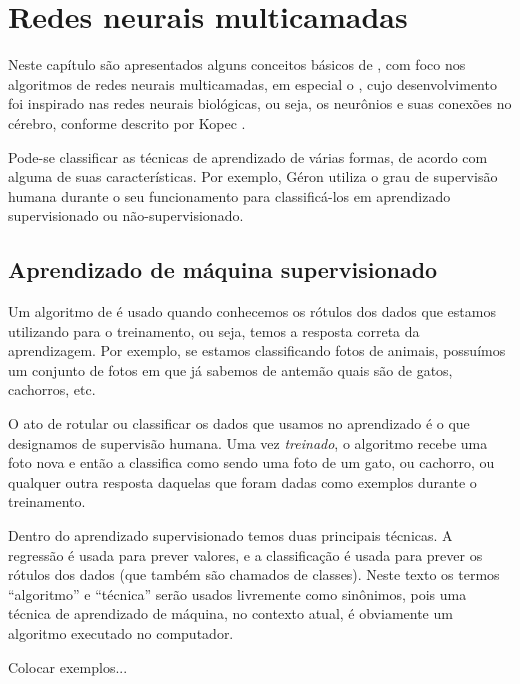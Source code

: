 
\chapter{Redes neurais multicamadas}

Neste capítulo são apresentados alguns conceitos básicos de , com foco nos algoritmos de redes neurais multicamadas, em especial o , cujo desenvolvimento foi inspirado nas redes neurais biológicas, ou seja, os neurônios e suas conexões no cérebro, conforme descrito por Kopec \citep{classic}.

Pode-se classificar as técnicas de aprendizado de várias formas, de acordo com alguma de suas características. Por exemplo, Géron \citep{hands} utiliza o grau de supervisão humana durante o seu funcionamento para classificá-los em aprendizado supervisionado ou não-supervisionado.

\section{Aprendizado de máquina supervisionado}

 Um algoritmo de  é usado quando conhecemos os rótulos dos dados que estamos utilizando para o treinamento, ou seja, temos a resposta correta da aprendizagem. Por exemplo, se estamos classificando fotos de animais, possuímos um conjunto de fotos em que já sabemos de antemão quais são de gatos, cachorros, etc.

 O ato de rotular ou classificar os dados que usamos no aprendizado é o que designamos de supervisão humana. Uma vez \emph{treinado}, o algoritmo recebe uma foto nova e então a classifica como sendo uma foto de um gato, ou cachorro, ou qualquer outra resposta daquelas que foram dadas como exemplos durante o treinamento.

Dentro do aprendizado supervisionado temos duas principais técnicas. A regressão é usada para prever valores, e a classificação é usada para prever os rótulos dos dados (que também são chamados de classes). Neste texto os termos ``algoritmo'' e ``técnica'' serão usados livremente como sinônimos, pois uma técnica de aprendizado de máquina, no contexto atual, é obviamente um algoritmo executado no computador.

Colocar exemplos...

